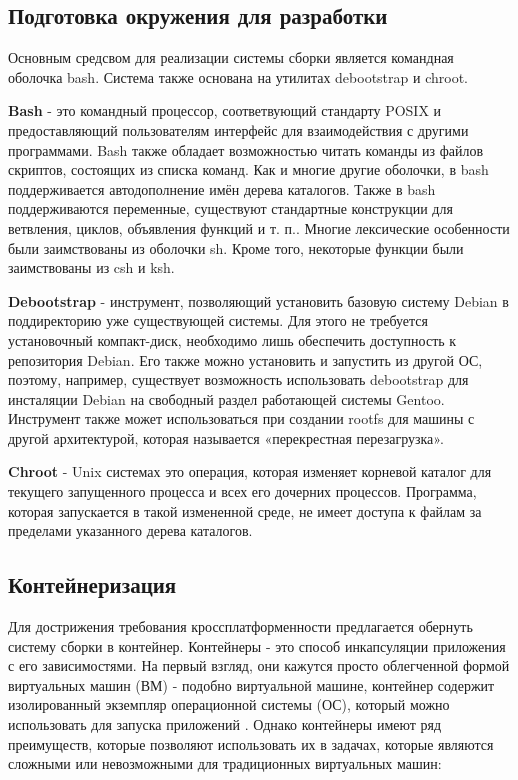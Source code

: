 \subsection{Подготовка окружения для разработки}
Основным средсвом для реализации системы сборки является командная оболочка bash.
Система также основана на утилитах debootstrap и chroot.

\textbf{Bash} - это командный процессор, соответвующий стандарту POSIX и предоставляющий пользователям интерфейс для взаимодействия с другими программами.
Bash также обладает возможностью читать команды из файлов скриптов, состоящих из списка команд.
Как и многие другие оболочки, в bash поддерживается автодополнение имён дерева каталогов.
Также в bash поддерживаются переменные, существуют стандартные конструкции для ветвления, циклов, объявления функций и т. п..
Многие лексические особенности были заимствованы из оболочки sh. Кроме того, некоторые функции были заимствованы из csh и ksh.

\textbf{Debootstrap} - инструмент, позволяющий установить базовую систему Debian в поддиректорию уже существующей системы.
Для этого не требуется установочный компакт-диск, необходимо лишь обеспечить доступность к репозитория Debian.
Его также можно установить и запустить из другой ОС, поэтому, например, существует возможность использовать debootstrap для инсталяции Debian на свободный раздел работающей системы Gentoo.
Инструмент также может использоваться при создании rootfs для машины с другой архитектурой, которая называется «перекрестная перезагрузка»\cite{DEBOOTSTRAP}.

\textbf{Chroot} - Unix системах это операция, которая изменяет корневой каталог для текущего запущенного процесса и всех его дочерних процессов.
Программа, которая запускается в такой измененной среде, не имеет доступа к файлам за пределами указанного дерева каталогов.

\newpage
\subsection{Контейнеризация}
Для дострижения требования кроссплатформенности предлагается обернуть систему сборки в контейнер.
Контейнеры - это способ инкапсуляции приложения с его зависимостями.
На первый взгляд, они кажутся просто облегченной формой виртуальных машин (ВМ) - подобно виртуальной машине, контейнер содержит изолированный экземпляр операционной системы (ОС), который можно использовать для запуска приложений \cite{DOCKER}.
Однако контейнеры имеют ряд преимуществ, которые позволяют использовать их в задачах, которые являются сложными или невозможными для традиционных виртуальных машин:

